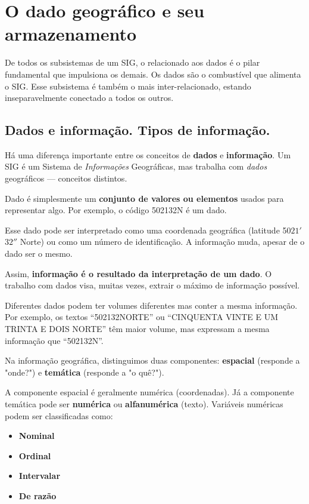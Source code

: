 \chapter{O dado geográfico e seu armazenamento}

De todos os subsistemas de um SIG, o relacionado aos dados é o pilar fundamental que impulsiona os demais. Os dados são o combustível que alimenta o SIG. Esse subsistema é também o mais inter-relacionado, estando inseparavelmente conectado a todos os outros.

\pagestyle{fancy}

\section{Dados e informação. Tipos de informação.}

Há uma diferença importante entre os conceitos de \textbf{dados} e \textbf{informação}. Um SIG é um Sistema de \emph{Informações} Geográficas, mas trabalha com \emph{dados} geográficos — conceitos distintos.

Dado é simplesmente um \textbf{conjunto de valores ou elementos} usados para representar algo. Por exemplo, o código 502132N é um dado.

Esse dado pode ser interpretado como uma coordenada geográfica (latitude 50\textdegree $21'$ $32''$ Norte) ou como um número de identificação. A informação muda, apesar de o dado ser o mesmo.

Assim, \textbf{informação é o resultado da interpretação de um dado}. O trabalho com dados visa, muitas vezes, extrair o máximo de informação possível.

Diferentes dados podem ter volumes diferentes mas conter a mesma informação. Por exemplo, os textos “502132NORTE” ou “CINQUENTA VINTE E UM TRINTA E DOIS NORTE” têm maior volume, mas expressam a mesma informação que “502132N”.

Na informação geográfica, distinguimos duas componentes: \textbf{espacial} (responde a "onde?") e \textbf{temática} (responde a "o quê?").

A componente espacial é geralmente numérica (coordenadas). Já a componente temática pode ser \textbf{numérica} ou \textbf{alfanumérica} (texto). Variáveis numéricas podem ser classificadas como:

\begin{itemize}
\item \textbf{Nominal}
\item \textbf{Ordinal}
\item \textbf{Intervalar}
\item \textbf{De razão}
\end{itemize}

